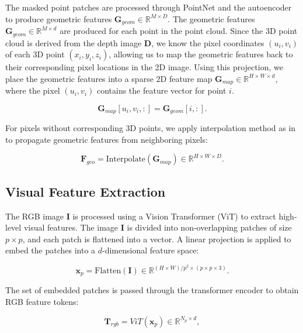 \noindent The masked point patches are processed through PointNet \cite{qi2017pointnet} and the autoencoder to produce geometric features $\mathbf{G}_{geom} \in \mathbb{R}^{M \times D}$. The geometric features $\mathbf{G}_{geom} \in \mathbb{R}^{M \times d}$ are produced for each point in the point cloud. Since the 3D point cloud is derived from the depth image $\mathbf{D}$, we know the pixel coordinates $(u_i, v_i)$ of each 3D point $(x_i, y_i, z_i)$, allowing us to map the geometric features back to their corresponding pixel locations in the 2D image. Using this projection, we place the geometric features into a sparse 2D feature map $\mathbf{G}_{map} \in \mathbb{R}^{H \times W \times d}$, where the pixel $(u_i, v_i)$ contains the feature vector for point $i$.

\begin{equation}
\mathbf{G}_{map}[u_i, v_i, :] = \mathbf{G}_{geom}[i, :].
\end{equation}

\noindent For pixels without corresponding 3D points, we apply interpolation method as in \cite{wang2023multimodal} to propagate geometric features from neighboring pixels:

\begin{equation}
    \mathbf{F}_{geo} = \text{Interpolate}(\mathbf{G}_{map}) \in \mathbb{R}^{H \times W \times D}.
\end{equation}

\subsection*{Visual Feature Extraction}

The RGB image $\mathbf{I}$ is processed using a Vision Transformer (ViT) \cite{dosovitskiy2020image} to extract high-level visual features. The image $\mathbf{I}$ is divided into non-overlapping patches of size $p \times p$, and each patch is flattened into a vector. A linear projection is applied to embed the patches into a $d$-dimensional feature space:

\begin{equation}
    \mathbf{x}_p = \text{Flatten}(\mathbf{I}) \in \mathbb{R}^{(H \times W) / p^2 \times (p \times p \times 3)}.
\end{equation}

\noindent The set of embedded patches is passed through the transformer encoder to obtain RGB feature tokens:

\begin{equation}
    \mathbf{T}_{rgb} = ViT(\mathbf{x}_p) \in \mathbb{R}^{N_p \times d},
\end{equation}

